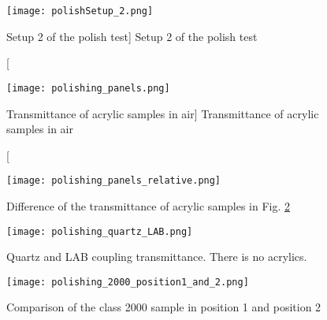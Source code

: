 \begin{figure}
    \label{fig:polishSetup_2}
    \centering
    \texttt{[image: polishSetup\_2.png]}
    \caption
    [Setup 2 of the polish test]
    {Setup 2 of the polish test}
    \end{figure}


%
%




\begin{figure} 
    \label{fig:polishing_panels}
    \centering
    \texttt{[image: polishing\_panels.png]}
    \caption
    [Transmittance of acrylic samples in air]
    {Transmittance of acrylic samples in air}
    \end{figure}



\begin{figure}
    \centering
    \texttt{[image: polishing\_panels\_relative.png]}
    \caption{Difference of the transmittance of acrylic samples in Fig. \ref{fig:polishing_panels}}
    \label{fig:polishing_panels_relative}
    \end{figure}


\begin{figure}
    \centering
    \texttt{[image: polishing\_quartz\_LAB.png]}
    \caption{Quartz and LAB coupling transmittance. There is no acrylics.}
    \label{fig:polishing_quartz_LAB}
    \end{figure}



\begin{figure}
    \centering
    \texttt{[image: polishing\_2000\_position1\_and\_2.png]}
    \caption{Comparison of the class 2000 sample in position 1 and position 2}
    \label{fig:polishing_2000_position1_and_2}
    \end{figure}



